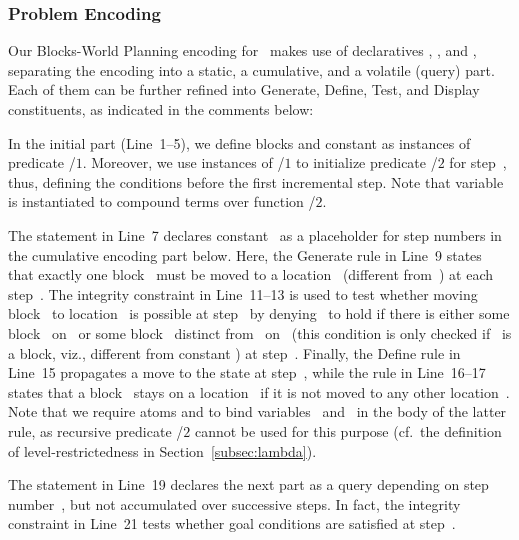 \subsubsection{Problem Encoding}\label{subsec:block:encoding}

Our Blocks-World Planning encoding for \iclingo\ makes use of declaratives
, , and ,
separating the encoding into a static, a cumulative, and a volatile (query) part.
Each of them can be further refined into Generate, Define, Test, and Display constituents, 
as indicated in the comments below:
%

%
In the initial  part (Line~1--5),
we define blocks and constant 
as instances of predicate /$1$.
Moreover, we use instances of /$1$
to initialize predicate /$2$ for step~, thus,
defining the conditions before the first incremental step.
Note that variable~ is instantiated to compound terms
over function /$2$.

The  statement in Line~7 declares constant~
as a placeholder for step numbers in the cumulative encoding part below.
Here, the Generate rule in Line~9 states that exactly one block~
must be moved to a location~ (different from~) at each step~.
The integrity constraint in Line~11--13 is used to test whether
moving block~ to location~ is possible at step~
by denying~ to hold if there
is either some block~ on~ or some block~ distinct from~ on~
(this condition is only checked if~ is a block, viz., different from constant )
at step~.
Finally, the Define rule in Line~15 propagates
a move to the state at step~,
while the rule in Line~16--17 states that a block~ stays on a location~
if it is not moved to any other location~.
Note that we require atoms  and 
to bind variables~ and~ in the body of the latter rule,
as recursive predicate /$2$ cannot be used for this purpose
(cf.\ the definition of level-restrictedness in Section~\ref{subsec:lambda}).

The  statement in Line~19 declares the next part as a
query depending on step number~, but not accumulated over
successive steps.
In fact, the integrity constraint in Line~21 tests whether goal conditions are
satisfied at step~.

